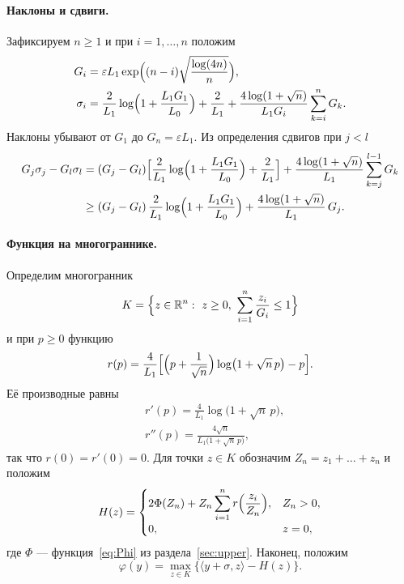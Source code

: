 \documentclass[11pt,a4paper]{article}
\newcommand{\R}{\mathbb R}
\newcommand{\ip}[2]{\langle #1,#2\rangle}
\begin{document}
\paragraph{Наклоны и сдвиги.} Зафиксируем $n\ge1$ и при $i=1,\dots,n$ положим
\begin{equation}\label{eq:slopes}
\begin{aligned}
 G_i&=\varepsilon L_1\exp\Bigl((n-i)\sqrt{\frac{\log(4n)}n}\Bigr),\\
 \sigma_i&=\frac2{L_1}\log\Bigl(1+\frac{L_1G_1}{L_0}\Bigr)+\frac2{L_1}+\frac{4\log(1+\sqrt n)}{L_1G_i}\sum_{k=i}^nG_k .
\end{aligned}
\end{equation}
Наклоны убывают от $G_1$ до $G_n=\varepsilon L_1$. Из определения сдвигов при $j<l$
\begin{equation}\label{eq:shift-gap}
\begin{aligned}
 G_j\sigma_j-G_l\sigma_l
 &=(G_j-G_l)\Bigl[\frac2{L_1}\log\Bigl(1+\frac{L_1G_1}{L_0}\Bigr)+\frac2{L_1}\Bigr]+\frac{4\log(1+\sqrt n)}{L_1}\sum_{k=j}^{l-1}G_k\\
 &\ge(G_j-G_l)\,\frac2{L_1}\log\Bigl(1+\frac{L_1G_1}{L_0}\Bigr)+\frac{4\log(1+\sqrt n)}{L_1}\,G_j .
\end{aligned}
\end{equation}

\paragraph{Функция на многограннике.} Определим многогранник
\[
 K=\Bigl\{z\in\R^n:\ z\ge0,\ \sum_{i=1}^n\frac{z_i}{G_i}\le1\Bigr\}
\]
и при $p\ge0$ функцию
\[
 r(p)=\frac4{L_1}\Bigl[\Bigl(p+\frac1{\sqrt n}\Bigr)\log\bigl(1+\sqrt n\,p\bigr)-p\Bigr].
\]
Её производные равны
\begin{equation}\label{eq:r-derivatives}
\begin{aligned}
 &r'(p)=\frac4{L_1}\log\bigl(1+\sqrt n\,p\bigr),\\
 &r''(p)=\frac{4\sqrt n}{L_1\bigl(1+\sqrt n\,p\bigr)},
\end{aligned}
\end{equation}
так что $r(0)=r'(0)=0$. Для точки $z\in K$ обозначим $Z_n=z_1+\dots+z_n$ и положим
\[
 H(z)=\begin{cases}
 2\Phi(Z_n)+Z_n\displaystyle\sum_{i=1}^nr\Bigl(\frac{z_i}{Z_n}\Bigr), & Z_n>0,\\[2pt]
 0, & z=0,
 \end{cases}
\]
где $\Phi$ --- функция~\eqref{eq:Phi} из раздела~\ref{sec:upper}. Наконец, положим
\begin{equation}\label{eq:ordered}
 \varphi(y)=\max_{z\in K}\bigl\{\ip{y+\sigma}z-H(z)\bigr\}.
\end{equation}
\end{document}
